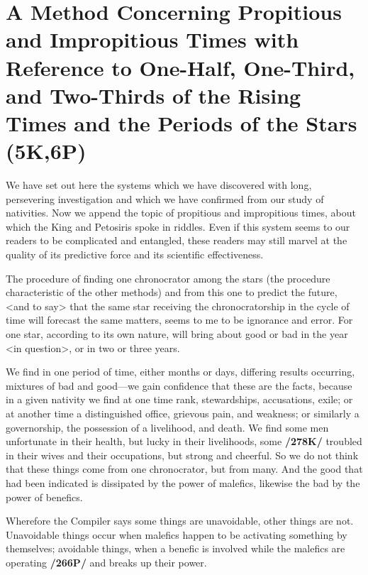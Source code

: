 \section{A Method Concerning Propitious and Impropitious Times with Reference to One-Half, One-Third, and Two-Thirds of the Rising Times and the Periods of the Stars (5K,6P)}

  
We have set out here the systems which we have discovered with long, persevering investigation and which we have confirmed from our study of nativities. Now we append the topic of propitious and
impropitious times, about which the King and Petosiris spoke in riddles. Even if this system seems to our readers to be complicated and entangled, these readers may still marvel at the quality of its predictive force and its scientific effectiveness. 

The  procedure of finding one chronocrator among the stars (the procedure characteristic of the other methods) and from this one to predict the future, <and to say> that the same star receiving the chronocratorship in the cycle of time will forecast the same matters, seems to me to be ignorance and error. For one star, according to its own nature, will bring about good or bad in the year <in question>, or in two or three years. 

We find in one period of time, either months or days, differing results occurring, mixtures of bad and good—we gain confidence that these are the facts, because in a given nativity we find at one time rank, stewardships, accusations, exile; or at another time a distinguished office, grievous pain, and weakness; or similarly a governorship, the possession of a livelihood, and death. We find some men unfortunate in their health, but lucky in their livelihoods, some \textbf{/278K/} troubled in their wives and their occupations, but strong and cheerful. So we do not think that these things come from one chronocrator, but from many. And the good that had been indicated is dissipated by the power of malefics, likewise the bad by the power of benefics.

Wherefore the Compiler says some things are unavoidable, other things are not. \mndl Unavoidable things occur when malefics happen to be activating something by themselves; avoidable things, when a benefic is involved while the malefics are operating \textbf{/266P/} and breaks up their power. 

